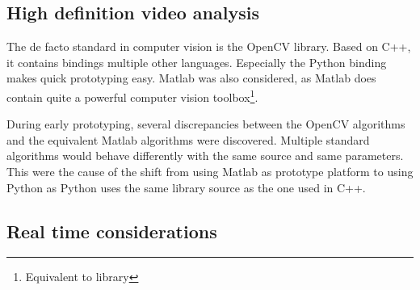 \subsection{High definition video analysis}
The de facto standard in computer vision is the OpenCV library. Based on C++, it contains bindings multiple other languages. Especially 
the Python binding makes quick prototyping easy. Matlab was also considered, as Matlab does contain quite a powerful 
computer vision toolbox\footnote{Equivalent to library}.

During early prototyping, several discrepancies between the OpenCV algorithms 
 and the equivalent Matlab 
algorithms were discovered. Multiple standard algorithms would behave differently with the same source and same parameters. This 
were the cause of the shift from using Matlab as prototype platform to using Python as Python uses the same library source 
as the one used in C++.

\subsection{Real time considerations}
